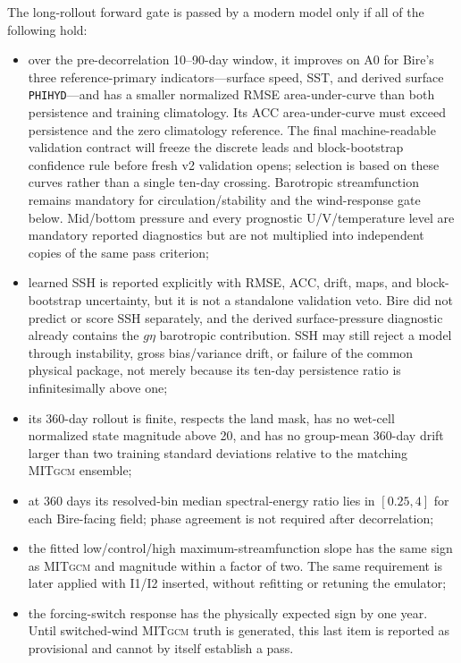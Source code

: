 \documentclass[11pt]{article}
\newcommand{\MITgcm}{\textsc{MITgcm}}
\begin{document}
The long-rollout forward gate is passed by a modern model only if all of the following
hold:
\begin{itemize}
\item over the pre-decorrelation 10--90-day window, it improves on A0 for Bire's three
  reference-primary indicators---surface speed, SST, and derived surface
  \texttt{PHIHYD}---and has a smaller normalized RMSE area-under-curve than both
  persistence and training climatology.  Its ACC area-under-curve must exceed
  persistence and the zero climatology reference.  The final machine-readable
  validation contract will freeze the discrete leads and block-bootstrap confidence
  rule before fresh v2 validation opens; selection is based on these curves rather than
  a single ten-day crossing.
  Barotropic streamfunction remains mandatory for circulation/stability and the
  wind-response gate below.  Mid/bottom pressure and every prognostic
  U/V/temperature level are mandatory reported diagnostics but are not multiplied into
  independent copies of the same pass criterion;
\item learned SSH is reported explicitly with RMSE, ACC, drift, maps, and
  block-bootstrap uncertainty, but it is not a standalone validation veto.  Bire did
  not predict or score SSH separately, and the derived surface-pressure diagnostic
  already contains the \(g\eta\) barotropic contribution.  SSH may still reject a model
  through instability, gross bias/variance drift, or failure of the common physical
  package, not merely because its ten-day persistence ratio is infinitesimally above
  one;
\item its 360-day rollout is finite, respects the land mask, has no wet-cell normalized
  state magnitude above 20, and has no group-mean 360-day drift larger than two training
  standard deviations relative to the matching \MITgcm{} ensemble;
\item at 360 days its resolved-bin median spectral-energy ratio lies in $[0.25,4]$ for
  each Bire-facing field; phase agreement is not required after decorrelation;
\item the fitted low/control/high maximum-streamfunction slope has the same sign as
  \MITgcm{} and magnitude within a factor of two.  The same requirement is later applied
  with I1/I2 inserted, without refitting or retuning the emulator;
\item the forcing-switch response has the physically expected sign by one year.  Until
  switched-wind \MITgcm{} truth is generated, this last item is reported as provisional
  and cannot by itself establish a pass.
\end{itemize}
\end{document}
